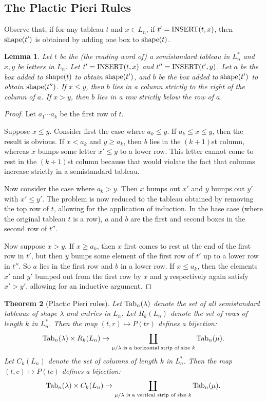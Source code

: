 \documentclass[11pt]{amsproc}
\newtheorem{theorem}{Theorem}[subsection]
\newtheorem{lemma}[theorem]{Lemma}
\theoremstyle{definition}
\theoremstyle{example}
\newcommand{\ins}{\textup{INSERT}}
\newcommand{\shape}{\textup{shape}}
\newcommand{\Tab}{\textup{Tab}}
\begin{document}
\subsection{The Plactic Pieri Rules}
Observe that, if for any tableau $t$ and $x\in L_n$, if $t'=\ins(t,x)$, then $\shape(t')$ is obtained by adding one box to $\shape(t)$.
\begin{lemma}
  \label{lemma:two-step}
  Let $t$ be the (the reading word of) a semistandard tableau in $L_n^*$ and $x,y$ be letters in $L_n$.
  Let $t'=\ins(t,x)$ and $t''=\ins(t',y)$.
  Let $a$ be the box added to $\shape(t)$ to obtain $\shape(t')$, and $b$ be the box added to $\shape(t')$ to obtain $\shape(t'')$.
  If $x\leq y$, then $b$ lies in a column strictly to the right of the column of $a$.
  If $x>y$, then $b$ lies in a row strictly below the row of $a$.
\end{lemma}
\begin{proof}
  Let $a_1\dotsb a_k$ be the first row of $t$.

  Suppose $x\leq y$.
  Consider first the case where $a_k\leq y$.
  If $a_k\leq x\leq y$, then the result is obvious.
  If $x<a_k$ and $y\geq a_k$, then $b$ lies in the $(k+1)$st column, whereas $x$ bumps some letter $x'\leq y$ to a lower row.
  This letter cannot come to rest in the $(k+1)$st column because that would violate the fact that columns increase strictly in a semistandard tableau.

  Now consider the case where $a_k>y$.
  Then $x$ bumps out $x'$ and $y$ bumps out $y'$ with $x'\leq y'$.
  The problem is now reduced to the tableau obtained by removing the top row of $t$, allowing for the application of induction.
  In the base case (where the original tableau $t$ is a row), $a$ and $b$ are the first and second boxes in the second row of $t''$.

  Now suppose $x>y$.
  If $x\geq a_k$, then $x$ first comes to rest at the end of the first row in $t'$, but then $y$ bumps some element of the first row of $t'$ up to a lower row in $t''$.
  So $a$ lies in the first row and $b$ in a lower row.
  If $x\leq a_k$, then the elements $x'$ and $y'$ bumped out from the first row by $x$ and $y$ respectively again satisfy $x'>y'$, allowing for an inductive argument.
\end{proof}
\begin{theorem}
  [Plactic Pieri rules]
  \label{theorem:plactic-pieri}
  Let $\Tab_n(\lambda)$ denote the set of all semistandard tableaux of shape $\lambda$ and entries in $L_n$.
  Let $R_k(L_n)$ denote the set of rows of length $k$ in $L_n^*$.
  Then the map $(t,r)\mapsto P(tr)$ defines a bijection:
  \begin{displaymath}
    \Tab_n(\lambda)\times R_k(L_n) \to \coprod_{\mu/\lambda \text{ is a horizontal strip of size $k$}} \Tab_n(\mu).
  \end{displaymath}
  Let $C_k(L_n)$ denote the set of columns of length $k$ in $L_n^*$.
  Then the map $(t,c)\mapsto P(tc)$ defines a bijection:
  \begin{displaymath}
    \Tab_n(\lambda)\times C_k(L_n) \to \coprod_{\mu/\lambda \text{ is a vertical strip of size $k$}} \Tab_n(\mu).
  \end{displaymath}
\end{theorem}
\end{document}
